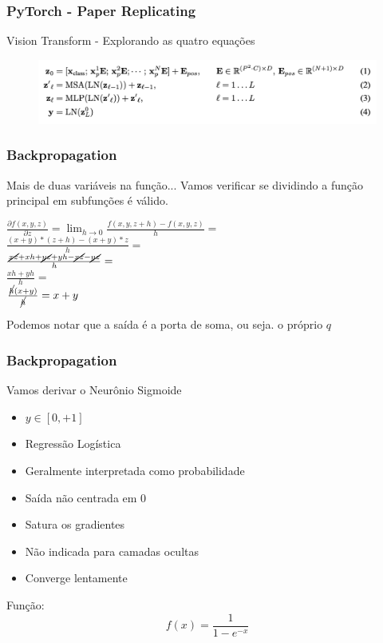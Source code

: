 \documentclass{beamer}
\begin{document}
\begin{frame}
	\frametitle{PyTorch - Paper Replicating}
	\begin{block}{Vision Transform - Explorando as quatro equações}
		\begin{figure}
			\centering
			\includegraphics[width=0.7\linewidth]{figures/vit_eq}
		\end{figure}
		
	\end{block}
\end{frame}
\begin{frame}
	\frametitle{Backpropagation}
	\begin{block}{Mais de duas variáveis na função...}
		Vamos verificar se dividindo a função principal em subfunções é válido.
	\end{block}
	\begin{example}
		\renewcommand{\CancelColor}{\color{red}}
		$\frac{\partial f(x,y, z)}{\partial z} = \lim_{h \rightarrow 0 }\frac{f(x, y,z+h) - f(x,y,z)}{h} = $ \\ 
		
		$ \frac{(x + y)*(z + h) - (x + y)*z}{h} = $ \\ $\frac{\cancel{xz}+xh + \cancel{yz} + yh - \cancel{xz} - \cancel{yz}}{h} = $ \\ $\frac{xh + yh}{h} =  $\\ $\frac{\cancel{h}(x + y)}{\cancel{h}} = x + y $
		
		Podemos notar que a saída é a porta de soma, ou seja. o próprio $q$
	\end{example}
\end{frame}
\begin{frame}
	\frametitle{Backpropagation}
	\begin{block}{Vamos derivar o Neurônio Sigmoide}
		\begin{itemize}
			\item $y \in [0, + 1]$
			\item Regressão Logística
			\item Geralmente interpretada como probabilidade
			\item Saída não centrada em $0$
			\item Satura os gradientes
			\item Não indicada para camadas ocultas
			\item Converge lentamente
		\end{itemize}
		Função:
		$$f(x) = \frac{1}{1-e^{-x}}$$
	\end{block}
\end{frame}
\end{document}
